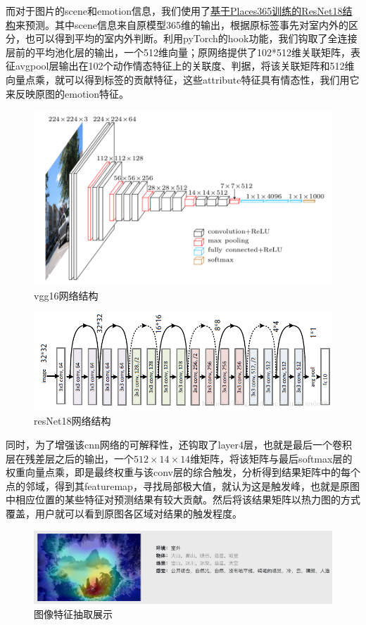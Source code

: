 \documentclass[a4paper, 10pt]{article}
\begin{document}
而对于图片的scene和emotion信息，我们使用了\href{http://places2.csail.mit.edu/PAMI_places.pdf}{基于Places365训练的ResNet18结构}来预测。其中scene信息来自原模型365维的输出，根据原标签事先对室内外的区分，也可以得到平均的室内外判断。利用pyTorch的hook功能，我们钩取了全连接层前的平均池化层的输出，一个512维向量；原网络提供了102*512维关联矩阵，表征avgpool层输出在102个动作情态特征上的关联度、判据，将该关联矩阵和512维向量点乘，就可以得到标签的贡献特征，这些attribute特征具有情态性，我们用它来反映原图的emotion特征。

\begin{figure}[H]
\centering
\includegraphics[width=0.6\linewidth]{imgs/1.png}
\caption{vgg16网络结构}
\end{figure}
\begin{figure}[H]
\centering
\includegraphics[width=0.6\linewidth]{imgs/2.png}
\caption{resNet18网络结构}
\end{figure}

同时，为了增强该cnn网络的可解释性，还钩取了layer4层，也就是最后一个卷积层在残差层之后的输出，一个$512\times 14\times 14$维矩阵，将该矩阵与最后softmax层的权重向量点乘，即是最终权重与该conv层的综合触发，分析得到结果矩阵中的每个点的邻域，得到其featuremap，寻找局部极大值，就认为这是触发峰，也就是原图中相应位置的某些特征对预测结果有较大贡献。然后将该结果矩阵以热力图的方式覆盖，用户就可以看到原图各区域对结果的触发程度。

\begin{figure}[H]
\centering
\includegraphics[width=0.8\linewidth]{imgs/3.png}
\caption{图像特征抽取展示}
\end{figure}
\end{document}

